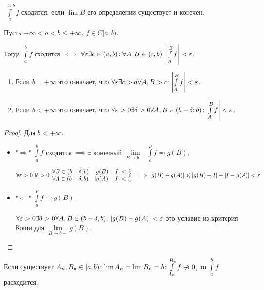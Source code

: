 \begin{definition}
    $\int\limits_a^{\to b} f$ сходится, если  $\lim B$ его определении существует и конечен.
\end{definition}

\begin{theorem}
    Пусть $-\infty < a < b \le +\infty$, $f \in C[a, b)$.

    Тогда $\int\limits_a^b f$ сходится  $\iff \forall \varepsilon \exists c \in (a, b)\!: \forall A, B \in (c, b)\ \left|\int\limits_A^B f\right| < \varepsilon$. 
\end{theorem}
\begin{remark}
    \begin{enumerate}
        \item Если $b = +\infty$ это означает, что  $\forall \varepsilon \exists c > a \forall A, B > c\!: \left| \int\limits_A^B f \right|  < \varepsilon$.
        \item  Если $b < +\infty$ это означает, что  $\forall \varepsilon > 0 \exists \delta > 0 \forall A, B \in (b-\delta; b)\!: \left|\int\limits_A^B f \right| < \varepsilon$.
    \end{enumerate}
\end{remark}
\begin{proof}
    Для $b < +\infty$. 
      \begin{itemize}
          \item "$\Rightarrow$" $\int\limits_a^b f$ сходится  $\implies \exists$ конечный  $\lim\limits_{B \to b-} \int\limits_a^B f \eqqcolon g(B)$.

              $\forall \varepsilon > 0 \exists \delta > 0 \begin{array}{lc} 
              \forall B \in (b - \delta, b) & |g(B) - I| < \frac{\varepsilon}{2}\\ 
          \forall A \in(b - \delta, b) & |g(A) - I| < \frac{\varepsilon}{2}\end{array} \implies |g(B) - g(A)| \leqslant |g(B) - I| + |I - g(A)| < \varepsilon$
      \item "$\Leftarrow$" $\int\limits_a^B f \eqqcolon g(B)$.

          $\forall \varepsilon > 0 \exists \delta > 0 \forall A, B \in (b-\delta, b)\!: |g(B)- g(A)| < \varepsilon$ это условие из критерия Коши для $\lim\limits_{B \to b-} g(B)$.
  \end{itemize}
\end{proof}
\begin{remark}
    Если существует $A_n, B_n \in [a, b)\!: \lim A_n = \lim B_n = b\!: \int\limits_{A_n}^{B_n} f \centernot\to 0$, то  $\int\limits_a^b f$ расходится.
\end{remark}
